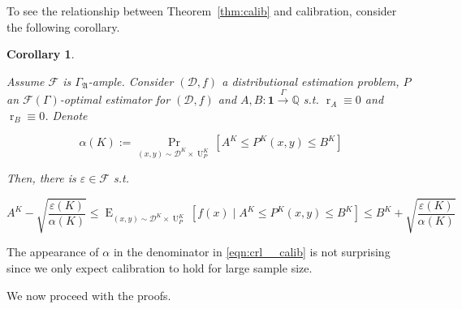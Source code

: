\documentclass{article}
\numberwithin{equation}{section}
\theoremstyle{definition}
\theoremstyle{plain}
\newtheorem{corollary}{Corollary}[section]
\DeclareMathOperator{\Prb}{Pr}
\DeclareMathOperator{\E}{E}
\DeclareMathOperator{\R}{r}
\DeclareMathOperator{\Un}{U}
\newcommand{\Rats}{\mathbb{Q}}
\newcommand{\Dist}{\mathcal{D}}
\newcommand{\GrowA}{\Gamma_{\mathfrak{A}}}
\newcommand{\Fall}{\mathcal{F}}
\newcommand{\EG}{\Fall(\Gamma)}
\newcommand{\Scheme}{\xrightarrow{\Gamma}}
\begin{document}
To see the relationship between Theorem~\ref{thm:calib} and calibration, consider the following corollary.

\begin{corollary}
\label{crl:calib}

Assume $\Fall$ is $\GrowA$-ample. Consider $(\Dist,f)$ a distributional estimation problem, $P$ an $\EG$-optimal estimator for $(\Dist,f)$ and $A,B: \bm{1} \Scheme \Rats$ s.t. $\R_A \equiv 0$ and $\R_B \equiv 0$. Denote

\[\alpha(K):=\Prb_{(x,y) \sim \Dist^{K} \times \Un_P^{K}}[A^{K} \leq P^{K}(x,y) \leq B^{K}]\] 

Then, there is $\varepsilon \in \Fall$ s.t. 

\begin{equation}
\label{eqn:crl__calib}
A^{K} - \sqrt{\frac{\varepsilon(K)}{\alpha(K)}} \leq \E_{(x,y) \sim \Dist^{K} \times \Un_P^{K}}[f(x) \mid A^{K} \leq P^{K}(x,y) \leq B^{K}] \leq B^{K} + \sqrt{\frac{\varepsilon(K)}{\alpha(K)}}
\end{equation}

\end{corollary}

The appearance of $\alpha$ in the denominator in \ref{eqn:crl__calib} is not surprising since we only expect calibration to hold for large sample size.

We now proceed with the proofs.
\end{document}
